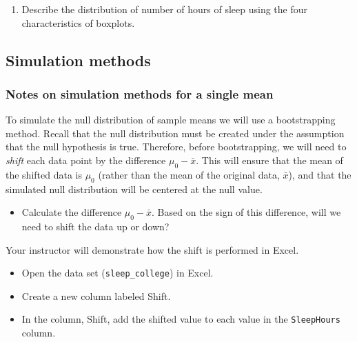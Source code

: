 \documentclass[
]{report}
\providecommand{\tightlist}{%
  \setlength{\itemsep}{0pt}\setlength{\parskip}{0pt}}
\begin{document}
\begin{enumerate}
\def\labelenumi{\arabic{enumi}.}
\setcounter{enumi}{1}
\tightlist
\item
  Describe the distribution of number of hours of sleep using the four characteristics of boxplots.
\end{enumerate}

\vspace{1in}

\subsection*{Simulation methods}\label{simulation-methods-1}

\subsubsection*{Notes on simulation methods for a single mean}\label{notes-on-simulation-methods-for-a-single-mean}

\vspace{2in}

To simulate the null distribution of sample means we will use a bootstrapping method. Recall that the null distribution must be created under the assumption that the null hypothesis is true. Therefore, before bootstrapping, we will need to \emph{shift} each data point by the difference \(\mu_0 - \bar{x}\). This will ensure that the mean of the shifted data is \(\mu_0\) (rather than the mean of the original data, \(\bar{x}\)), and that the simulated null distribution will be centered at the null value.

\begin{itemize}
\tightlist
\item
  Calculate the difference \(\mu_0 - \bar{x}\). Based on the sign of this difference, will we need to shift the data up or down?
\end{itemize}

\vspace{0.4in}

Your instructor will demonstrate how the shift is performed in Excel.

\begin{itemize}
\item
  Open the data set (\texttt{sleep\_college}) in Excel.
\item
  Create a new column labeled Shift.
\item
  In the column, Shift, add the shifted value to each value in the \texttt{SleepHours} column.
\end{itemize}
\end{document}
